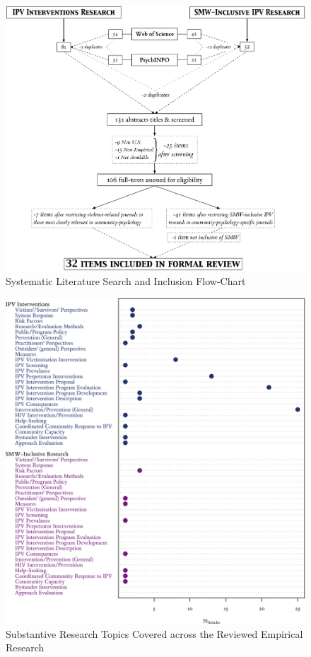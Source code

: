 \documentclass[11pt,]{tufte-book}
\begin{document}
\begin{figure}
\centering
\includegraphics{graphics/inputs/flowchart.png}
\caption{Systematic Literature Search and Inclusion
Flow-Chart\label{fig:flowchart}}
\end{figure}

\newpage

\begin{figure}
\centering
\includegraphics{graphics/inputs/topics.png}
\caption{Substantive Research Topics Covered across the Reviewed
Empirical Research\label{fig:topics}}
\end{figure}
\end{document}
